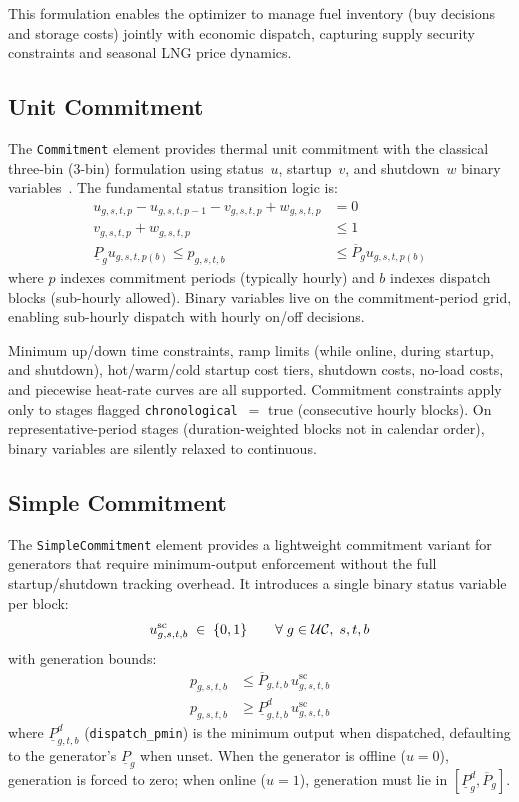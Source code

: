 This formulation enables the optimizer to manage fuel inventory (buy
decisions and storage costs) jointly with economic dispatch, capturing
supply security constraints and seasonal LNG price dynamics.

\subsection{Unit Commitment}
\label{sec:uc}

The \texttt{Commitment} element provides thermal unit commitment with
the classical three-bin (3-bin) formulation using status~$u$,
startup~$v$, and shutdown~$w$ binary
variables~\cite{morales2013,knueven2020}.  The fundamental status
transition logic is:
\begin{align}
u_{g,s,t,p} - u_{g,s,t,p-1} - v_{g,s,t,p} + w_{g,s,t,p}
  &= 0
  \label{eq:uc_logic} \\
v_{g,s,t,p} + w_{g,s,t,p}
  &\leq 1
  \label{eq:uc_excl} \\
\underline{P}_g u_{g,s,t,p(b)}
  \leq p_{g,s,t,b}
  &\leq \overline{P}_g u_{g,s,t,p(b)}
  \label{eq:uc_bounds}
\end{align}
where $p$ indexes commitment periods (typically hourly) and $b$ indexes
dispatch blocks (sub-hourly allowed).  Binary variables live on the
commitment-period grid, enabling sub-hourly dispatch with hourly on/off
decisions.

Minimum up/down time constraints, ramp limits (while online, during
startup, and shutdown), hot/warm/cold startup cost tiers, shutdown
costs, no-load costs, and piecewise heat-rate curves are all supported.
Commitment constraints apply only to stages flagged
\texttt{chronological}~$=$ true (consecutive hourly blocks).  On
representative-period stages (duration-weighted blocks not in calendar
order), binary variables are silently relaxed to continuous.

\subsection{Simple Commitment}
\label{sec:sc}

The \texttt{SimpleCommitment} element provides a lightweight commitment
variant for generators that require minimum-output enforcement without
the full startup/shutdown tracking overhead.  It introduces a single
binary status variable per block:
\begin{equation}
u_{g,s,t,b}^{\text{sc}} \;\in\; \{0,1\}
\qquad \forall \; g \in \mathcal{UC},\; s,t,b
\label{eq:sc_var}
\end{equation}
with generation bounds:
\begin{align}
p_{g,s,t,b}
  &\leq \overline{P}_{g,t,b}\,u_{g,s,t,b}^{\text{sc}}
  \label{eq:sc_upper} \\
p_{g,s,t,b}
  &\geq \underline{P}_{g,t,b}^{d}\,u_{g,s,t,b}^{\text{sc}}
  \label{eq:sc_lower}
\end{align}
where $\underline{P}_{g,t,b}^{d}$ (\texttt{dispatch\_pmin}) is the
minimum output when dispatched, defaulting to the generator's
$\underline{P}_g$ when unset.  When the generator is offline ($u = 0$),
generation is forced to zero; when online ($u = 1$), generation must lie
in $[\underline{P}_{g}^{d}, \overline{P}_{g}]$.

